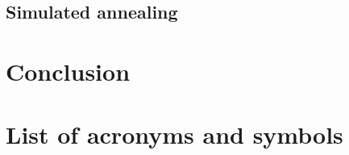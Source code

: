 \documentclass[a4paper, twoside, 11pt]{report}
\theoremstyle{plain}
\theoremstyle{definition}
\theoremstyle{remark}
\begin{document}
\section{Simulated annealing}


\chapter{Conclusion}

\newpage
\chapter*{List of acronyms and symbols}
\printglossaries



\end{document}
